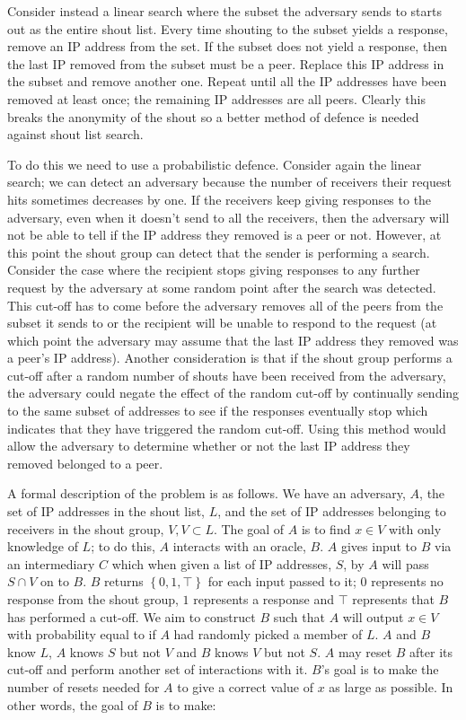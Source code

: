 \documentclass[ %
                    author={Luke Murray},
                supervisor={Dr. Simon Hollis},
                     title={Shadow Peer-to-Peer Networks},
                  subtitle={},
                    degree={MEng},
                      year={2013} ]{thesis}
\begin{document}
Consider instead a linear search where the subset the adversary sends to starts out as the entire shout list. Every time shouting to the subset yields a response, remove an IP address from the set. If the subset does not yield a response, then the last IP removed from the subset must be a peer. Replace this IP address in the subset and remove another one. Repeat until all the IP addresses have been removed at least once; the remaining IP addresses are all peers. Clearly this breaks the anonymity of the shout so a better method of defence is needed against shout list search.

To do this we need to use a probabilistic defence. Consider again the linear search; we can detect an adversary because the number of receivers their request hits sometimes decreases by one. If the receivers keep giving responses to the adversary, even when it doesn't send to all the receivers, then the adversary will not be able to tell if the IP address they removed is a peer or not. However, at this point the shout group can detect that the sender is performing a search. Consider the case where the recipient stops giving responses to any further request by the adversary at some random point after the search was detected. This cut-off has to come before the adversary removes all of the peers from the subset it sends to or the recipient will be unable to respond to the request (at which point the adversary may assume that the last IP address they removed was a peer's IP address). Another consideration is that if the shout group performs a cut-off after a random number of shouts have been received from the adversary, the adversary could negate the effect of the random cut-off by continually sending to the same subset of addresses to see if the responses eventually stop which indicates that they have triggered the random cut-off. Using this method would allow the adversary to determine whether or not the last IP address they removed belonged to a peer.

A formal description of the problem is as follows. We have an adversary, $A$, the set of IP addresses in the shout list, $L$, and the set of IP addresses belonging to receivers in the shout group, $V, V \subset L$. The goal of $A$ is to find $x \in V$ with only knowledge of $L$; to do this, $A$ interacts with an oracle, $B$. $A$ gives input to $B$ via an intermediary $C$ which when given a list of IP addresses, $S$, by $A$ will pass $S \cap V$ on to $B$. $B$ returns $\left\{0, 1, \top\right\}$ for each input passed to it; $0$ represents no response from the shout group, $1$ represents a response and $\top$ represents that $B$ has performed a cut-off. We aim to construct $B$ such that $A$ will output $x \in V$ with probability equal to if $A$ had randomly picked a member of $L$. $A$ and $B$ know $L$, $A$ knows $S$ but not $V$ and $B$ knows $V$ but not $S$. $A$ may reset $B$ after its cut-off and perform another set of interactions with it. $B$'s goal is to make the number of resets needed for $A$ to give a correct value of $x$ as large as possible. In other words, the goal of $B$ is to make:
\end{document}
